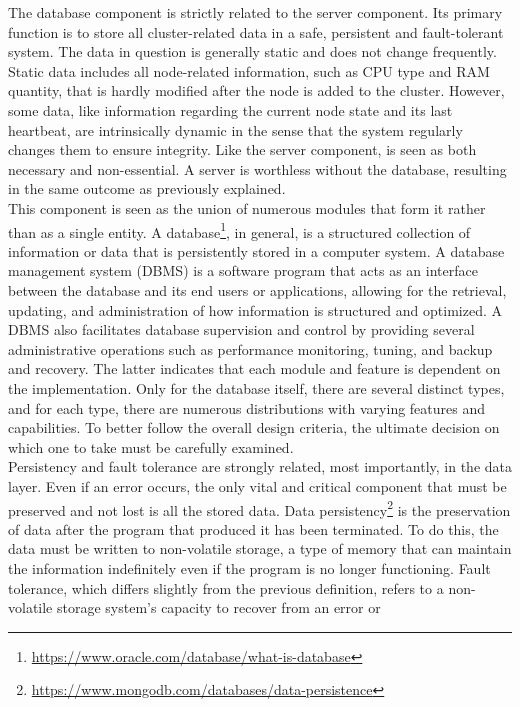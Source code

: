 The database component is strictly related to the server component. Its primary function
is to store all cluster-related data in a safe, persistent and fault-tolerant
system. The data in question is generally static and does not change frequently.
Static data includes all node-related information, such as CPU type and RAM quantity,
that is hardly modified after the node is added to the cluster. However, some
data, like information regarding the current node state and its last heartbeat,
are intrinsically dynamic in the sense that the system regularly changes them to
ensure integrity. Like the server component, is seen as both necessary and non-essential.
A server is worthless without the database, resulting in the same outcome as
previously explained. \\ %
This component is seen as the union of numerous modules that form it rather than
as a single entity. A database\footnote{\url{https://www.oracle.com/database/what-is-database}},
in general, is a structured collection of information or data that is persistently
stored in a computer system. A database management system (DBMS) is a software
program that acts as an interface between the database and its end users or
applications, allowing for the retrieval, updating, and administration of how information
is structured and optimized. A DBMS also facilitates database supervision and
control by providing several administrative operations such as performance
monitoring, tuning, and backup and recovery. The latter indicates that each module
and feature is dependent on the implementation. Only for the database itself, there
are several distinct types, and for each type, there are numerous distributions with
varying features and capabilities. To better follow the overall design criteria,
the ultimate decision on which one to take must be carefully examined. \\ %
Persistency and fault tolerance are strongly related, most importantly, in the data
layer. Even if an error occurs, the only vital and critical component that must be
preserved and not lost is all the stored data. Data persistency\footnote{\url{https://www.mongodb.com/databases/data-persistence}}
is the preservation of data after the program that produced it has been
terminated. To do this, the data must be written to non-volatile storage, a type
of memory that can maintain the information indefinitely even if the program is no
longer functioning. Fault tolerance, which differs slightly from the previous definition,
refers to a non-volatile storage system's capacity to recover from an error or
